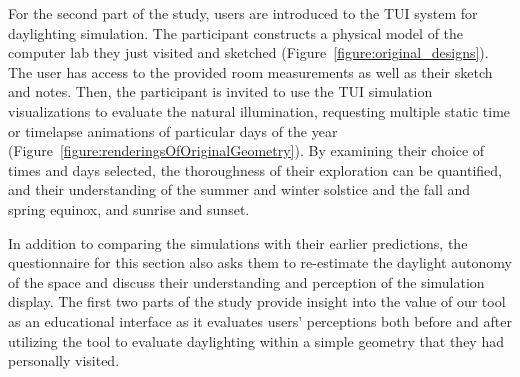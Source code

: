 \documentclass[preprint]{elsarticle}
\begin{document}
For the second part of the study, users are introduced to the TUI
system for daylighting simulation. 
%
%
%
%
%
The participant constructs a
physical model of the computer lab they just visited and sketched
(Figure~\ref{figure:original_designs}).
The user has access to the provided room measurements as well as their
sketch and notes.  Then, the participant is invited to use the TUI
simulation visualizations to evaluate the natural illumination,
requesting multiple static time or timelapse animations of particular
days of the year
(Figure~\ref{figure:renderingsOfOriginalGeometry}).  By examining their choice of times and days
selected, the thoroughness of their exploration can be quantified, and
their understanding of the summer and winter solstice and the fall and
spring equinox, and sunrise and sunset.

In addition to comparing the simulations with their earlier
predictions, the questionnaire for this section also asks them to
re-estimate the daylight autonomy of the space and discuss their
understanding and perception of the simulation display.  The first two
parts of the study provide insight into the value of our tool as an
educational interface as it evaluates users' perceptions both before
and after utilizing the tool to evaluate daylighting within a simple
geometry that they had personally visited.
\end{document}
